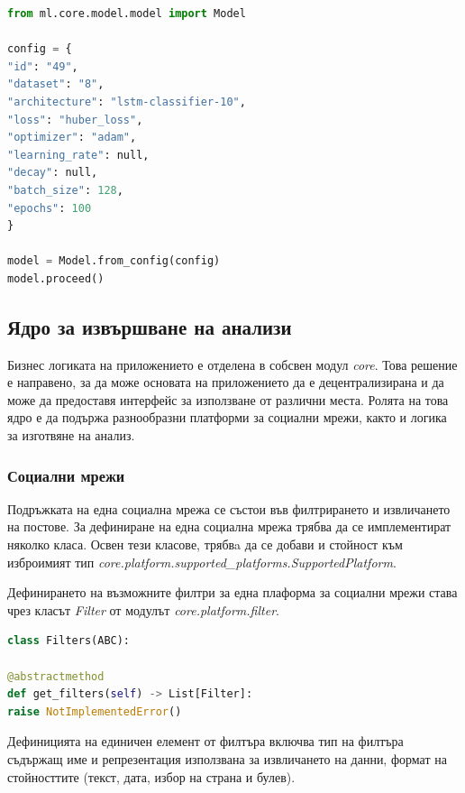 \documentclass{article}
\newcounter{subsubsubsection}[subsubsection]
\begin{document}
\begin{lstlisting}[language=Python, caption=Трениране на примерен модел.]
from ml.core.model.model import Model

config = {
"id": "49",
"dataset": "8",
"architecture": "lstm-classifier-10",
"loss": "huber_loss",
"optimizer": "adam",
"learning_rate": null,
"decay": null,
"batch_size": 128,
"epochs": 100
}

model = Model.from_config(config)
model.proceed()
\end{lstlisting}

\subsection{Ядро за извършване на анализи}

Бизнес логиката на приложението е отделена в собсвен модул \textit{core}. Това решение е направено, за да може основата
на приложението да е децентрализирана и да може да предоставя интерфейс за използване от различни места. Ролята на това
ядро е да подържа разнообразни платформи за социални мрежи, както и логика за изготвяне на анализ.

\subsubsection{Социални мрежи}

Подръжката на една социална мрежа се състои във филтрирането и извличането на постове. За дефиниране на една социална
мрежа трябва да се имплементират няколко класа. Освен тези класове, трябвa да се добави и стойност към изброимият тип
\textit{core.platform.supported\_platforms.SupportedPlatform}.


Дефинирането на възможните филтри за една плаформа за социални мрежи става чрез класът \textit{Filter} от модулът
\textit{core.platform.filter}.

\begin{lstlisting}[language=Python, caption=Абстрактен клас дефиниращ интерфейс за задаване на възможни филтри.]
class Filters(ABC):

@abstractmethod
def get_filters(self) -> List[Filter]:
raise NotImplementedError()
\end{lstlisting}

Дефиницията на единичен елемент от филтъра включва тип на филтъра съдържащ име и репрезентация използвана за
извличането на данни, формат на стойносттите (текст, дата, избор на страна и булев).
\end{document}
